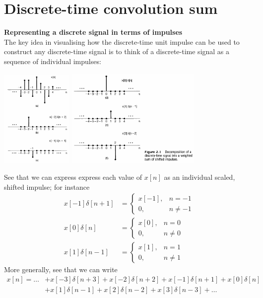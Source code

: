 \documentclass{report}
\begin{document}
\section{Discrete-time convolution sum}
\textbf{Representing a discrete signal in terms of impulses}\\
The key idea in visualising how the discrete-time unit impulse can be used to construct any discrete-time signal is to think of a discrete-time signal as a sequence of individual impulses:
\begin{center}
\includegraphics[width=3.5cm]{a16}
\includegraphics[width=6.5cm]{a17}\\
\end{center}
See that we can express express each value of $x[n]$ as an individual scaled, shifted impulse; for instance
\begin{align*}
x[-1]\delta[n+1]&=\begin{cases}x[-1],&n=-1\\
0,&n\neq-1\end{cases}\\
x[0]\delta[n]&=\begin{cases}x[0],&n=0\\
0,&n\neq0\end{cases}\\
x[1]\delta[n-1]&=\begin{cases}x[1],&n=1\\
0,&n\neq1\end{cases}
\end{align*}
More generally, see that we can write
\begin{align*}
x[n]=\ldots&+x[-3]\delta[n+3]+x[-2]\delta[n+2]+x[-1]\delta[n+1]
+x[0]\delta[n]\\
&+x[1]\delta[n-1]+x[2]\delta[n-2]+x[3]\delta[n-3]+\ldots
\end{align*}
\end{document}

